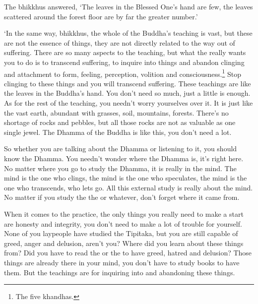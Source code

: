 The bhikkhus answered, `The leaves in the Blessed One's hand are few, the leaves scattered around the forest floor are by far the greater number.' 

`In the same way, bhikkhus, the whole of the Buddha's teaching is vast, but these are not the essence of things, they are not directly related to the way out of suffering. There are so many aspects to the teaching, but what the  really wants you to do is to transcend suffering, to inquire into things and abandon clinging and attachment to form, feeling, perception, volition and consciousness.\footnote{The five khandhas.} Stop clinging to these things and you will transcend suffering. These teachings are like the leaves in the Buddha's hand. You don't need so much, just a little is enough. As for the rest of the teaching, you needn't worry yourselves over it. It is just like the vast earth, abundant with grasses, soil, mountains, forests. There's no shortage of rocks and pebbles, but all those rocks are not as valuable as one single jewel. The Dhamma of the Buddha is like this, you don't need a lot. 

So whether you are talking about the Dhamma or listening to it, you should know the Dhamma. You needn't wonder where the Dhamma is, it's right here. No matter where you go to study the Dhamma, it is really in the mind. The mind is the one who clings, the mind is the one who speculates, the mind is the one who transcends, who lets go. All this external study is really about the mind. No matter if you study the  the  or whatever, don't forget where it came from. 

When it comes to the practice, the only things you really need to make a start are honesty and integrity, you don't need to make a lot of trouble for yourself. None of you laypeople have studied the Tipi\.taka, but you are still capable of greed, anger and delusion, aren't you? Where did you learn about these things from? Did you have to read the  or the  to have greed, hatred and delusion? Those things are already there in your mind, you don't have to study books to have them. But the teachings are for inquiring into and abandoning these things. 

